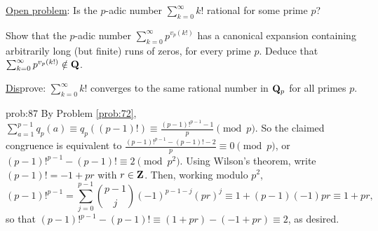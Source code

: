 \underline{Open problem}: Is the $p$-adic number $\sum_{k=0}^{\infty} k!$ rational for some prime $p$?

\begin{challenge} Show that the $p$-adic number $\sum_{k=0}^{\infty} p^{v_p(k!)}$ has a canonical expansion containing arbitrarily long (but finite) runs of zeros, for every prime $p$. Deduce that $\sum_{k=0}^{\infty} p^{v_p(k!)} \notin \mathbf{Q}$.
\end{challenge}

\begin{challenge} \underline{Dis}prove: $\sum_{k=0}^{\infty} k!$ converges to the same rational number in $\mathbf{Q}_p$ for all primes $p$.
\end{challenge}


\begin{sol}{prob:87} By Problem \ref{prob:72}, $\sum_{a=1}^{p-1} q_p(a) \equiv q_p((p-1)!) \equiv \frac{(p-1)!^{p-1}-1}{p}\pmod{p}$. So the claimed congruence is equivalent to $\frac{(p-1)!^{p-1}-(p-1)!-2}{p}\equiv 0\pmod{p}$, or $(p-1)!^{p-1} - (p-1)! \equiv 2\pmod{p^2}$. Using Wilson's theorem, write $(p-1)! = -1 + pr$ with $r \in \mathbf{Z}$. Then, working modulo $p^2$, 
\[ (p-1)!^{p-1} = \sum_{j=0}^{p-1} \binom{p-1}{j} (-1)^{p-1-j} (pr)^{j} \equiv 1 + (p-1)(-1)pr \equiv 1 + pr,\] so that $(p-1)!^{p-1} - (p-1)! \equiv (1+pr)-(-1+pr) \equiv 2$, as desired.
\end{sol}

